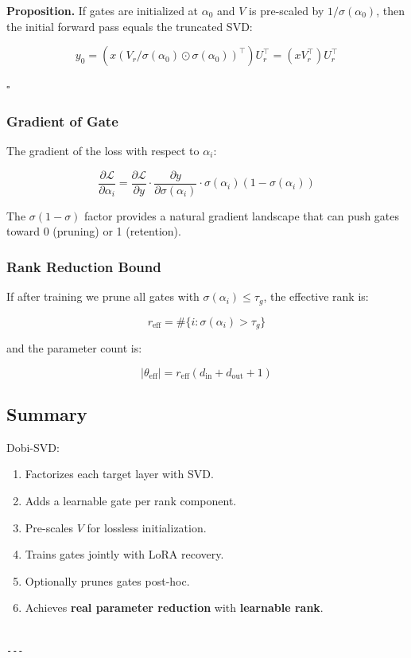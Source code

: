 \textbf{Proposition.} If gates are initialized at $\alpha_0$ and $V$ is 
pre-scaled by $1/\sigma(\alpha_0)$, then the initial forward pass equals 
the truncated SVD:

\[
y_0 = (x (V_r / \sigma(\alpha_0) \odot \sigma(\alpha_0))^\top) U_r^\top = (x V_r^\top) U_r^\top
\tag{4.12}
\]

$\square$

\subsubsection{Gradient of Gate}

The gradient of the loss with respect to $\alpha_i$:

\[
\frac{\partial \mathcal{L}}{\partial \alpha_i}
= \frac{\partial \mathcal{L}}{\partial y} \cdot \frac{\partial y}{\partial \sigma(\alpha_i)} \cdot \sigma(\alpha_i)(1 - \sigma(\alpha_i))
\tag{4.13}
\]

The $\sigma(1-\sigma)$ factor provides a natural gradient landscape 
that can push gates toward 0 (pruning) or 1 (retention).

\subsubsection{Rank Reduction Bound}

If after training we prune all gates with $\sigma(\alpha_i) \leq \tau_g$, the 
effective rank is:

\[
r_\text{eff} = \#\{i : \sigma(\alpha_i) > \tau_g\}
\tag{4.14}
\]

and the parameter count is:

\[
|\theta_\text{eff}| = r_\text{eff}(d_\text{in} + d_\text{out} + 1)
\tag{4.15}
\]

\subsection{Summary}

Dobi-SVD:
\begin{enumerate}
\item Factorizes each target layer with SVD.
\item Adds a learnable gate per rank component.
\item Pre-scales $V$ for lossless initialization.
\item Trains gates jointly with LoRA recovery.
\item Optionally prunes gates post-hoc.
\item Achieves \textbf{real parameter reduction} with \textbf{learnable rank}.
\end{enumerate}
\begin{lstlisting}

---
\end{lstlisting}